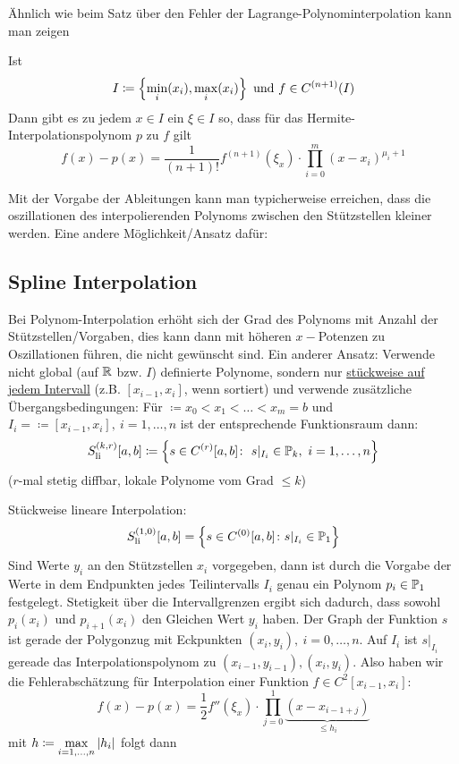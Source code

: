 Ähnlich wie beim Satz über den Fehler der Lagrange-Polynominterpolation kann man zeigen
\begin{theorem}
    Ist \[
    I \coloneqq \left\{ \min_i(x_i), \max_i(x_i) \right\} \text{ und } f\in C^{(n+1)}(I)
    \]
    Dann gibt es zu jedem $x\in I$ ein $\xi \in I$ so, dass für das Hermite-Interpolationspolynom $p$ zu $f$ gilt\[
    f(x) - p(x) = \frac{1}{(n+1)!}f^{(n+1)}(\xi_x) \cdot \prod_{i=0}^m (x-x_i)^{\mu_i + 1}
    \]
\end{theorem}
Mit der Vorgabe der Ableitungen kann man typicherweise erreichen, dass die oszillationen des interpolierenden Polynoms
zwischen den Stützstellen kleiner werden. Eine andere Möglichkeit/Ansatz dafür:
\subsection{Spline Interpolation}
Bei Polynom-Interpolation erhöht sich der Grad des Polynoms mit Anzahl der Stützstellen/Vorgaben, dies kann dann mit 
höheren $x-$Potenzen zu Oszillationen führen, die nicht gewünscht sind. Ein anderer Ansatz:  Verwende nicht global (auf 
$\mathbb{R}$ bzw. $I$) definierte Polynome, sondern nur \underline{stückweise auf jedem Intervall} (z.B. $[x_{i-1},x_i]$, wenn 
sortiert) und verwende zusätzliche Übergangsbedingungen: Für $\coloneqq x_0<x_1<\dots<x_m=b$ und $I_i=\coloneqq[x_{i-
1},x_i], \ i=1,\dots,n$ ist der entsprechende Funktionsraum dann:\\
\[
    S_{\text{li}}^{(k,r)}[a,b] \coloneqq \left\{ s\in C^{(r)}[a,b]\colon\  s\vert_{I_i} \in \mathbb{P}_k, \ i=1,\dots,n  \right\}
\]
($r$-mal stetig diffbar, lokale Polynome vom Grad $\leq k$)


\begin{example}
    Stückweise lineare Interpolation: \[
    S_{\text{li}}^{(1,0)}[a,b] = \left\{ s\in C^{(0)}[a,b]\colon s\vert_{I_i}\in \mathbb{P}_1  \right\}
    \]
    Sind Werte $y_i$ an den Stützstellen $x_i$ vorgegeben, dann ist durch die Vorgabe der Werte in dem Endpunkten jedes 
    Teilintervalls $I_i$ genau ein Polynom $p_i\in\mathbb{P}_1$ festgelegt. Stetigkeit über die Intervallgrenzen ergibt sich 
    dadurch, dass sowohl $p_i(x_i)$ und $p_{i+1}(x_i)$ den Gleichen Wert $y_i$ haben. Der Graph der Funktion $s$ ist 
    gerade der Polygonzug mit Eckpunkten $(x_i, y_i),\ i=0,\dots, n$. Auf $I_i$ ist $s\vert_{I_i}$ gereade das 
    Interpolationspolynom zu $(x_{i-1}, y_{i-1}), (x_i, y_i)$. Also haben wir die Fehlerabschätzung für Interpolation einer
    Funktion $f\in C^2[x_{i-1}, x_i]:$\[
        f(x) - p(x) = \frac{1}{2}f''(\xi_x) \cdot \prod_{j=0}^1 \underset{\leq h_i}{\underbrace{(x-x_{i-1 + j})}}
    \] mit $h \coloneqq \max\limits_{i=1, \dots, n}\left\vert h_i \right\vert$ folgt dann
\end{example}

